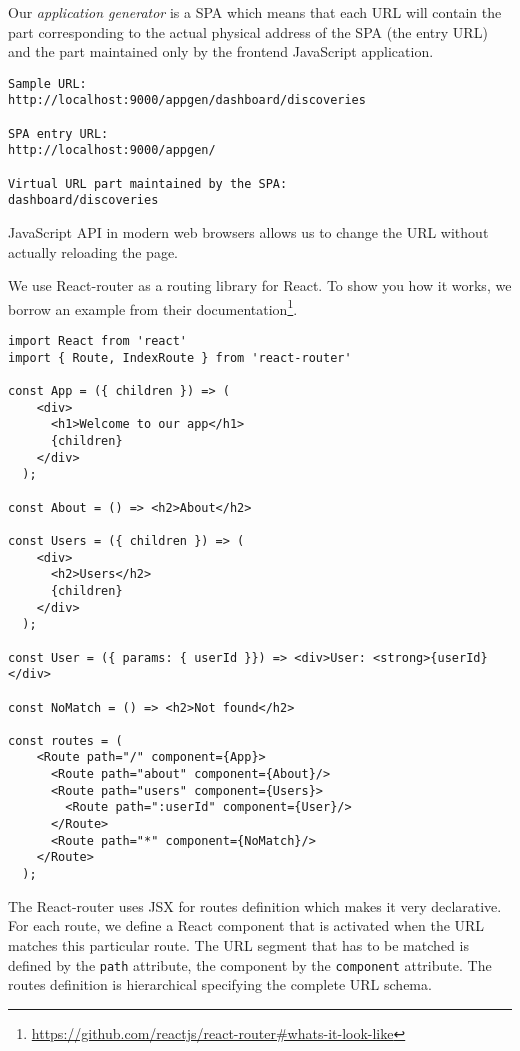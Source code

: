 Our \emph{application generator} is a SPA which means that each URL will contain the part corresponding to the actual physical address of the SPA (the entry URL) and the part maintained only by the frontend JavaScript application.

\begin{verbatim}
Sample URL: 
http://localhost:9000/appgen/dashboard/discoveries

SPA entry URL: 
http://localhost:9000/appgen/

Virtual URL part maintained by the SPA: 
dashboard/discoveries
\end{verbatim}

JavaScript API in modern web browsers allows us to change the URL without actually reloading the page.

We use React-router \cite{react-router} as a routing library for React. To show you how it works, we borrow an example from their documentation\footnote{\url{https://github.com/reactjs/react-router\#whats-it-look-like}}.

\begin{verbatim}
import React from 'react'
import { Route, IndexRoute } from 'react-router'

const App = ({ children }) => (
    <div>
      <h1>Welcome to our app</h1>
      {children}
    </div>
  );

const About = () => <h2>About</h2>

const Users = ({ children }) => (
    <div>
      <h2>Users</h2>
      {children}
    </div>
  );

const User = ({ params: { userId }}) => <div>User: <strong>{userId}</div>

const NoMatch = () => <h2>Not found</h2>

const routes = (
    <Route path="/" component={App}>
      <Route path="about" component={About}/>
      <Route path="users" component={Users}>
        <Route path=":userId" component={User}/>
      </Route>
      <Route path="*" component={NoMatch}/>
    </Route>
  );
\end{verbatim}

The React-router uses JSX for routes definition which makes it very declarative. For each route, we define a React component that is activated when the URL matches this particular route. The URL segment that has to be matched is defined by the \texttt{path} attribute, the component by the \texttt{component} attribute. The routes definition is hierarchical specifying the complete URL schema.

